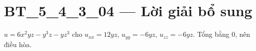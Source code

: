 \documentclass[10pt,a4paper]{article}
\begin{document}
\section*{BT\_5\_4\_3\_04 — Lời giải bổ sung}
$u=6x^2yz-y^3z-yz^3$ cho $u_{xx}=12yz$, $u_{yy}=-6yz$, $u_{zz}=-6yz$. Tổng bằng 0, nên điều hòa.
\end{document}
